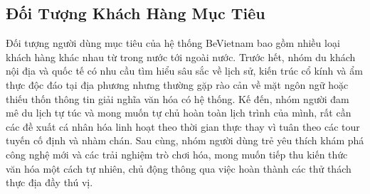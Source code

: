 \subsection{Đối Tượng Khách Hàng Mục Tiêu}
\contrib

Đối tượng người dùng mục tiêu của hệ thống BeVietnam bao gồm nhiều loại khách hàng khác nhau từ trong
nước tới ngoài nước. Trước hết, nhóm du khách nội địa và quốc tế có nhu
cầu tìm hiểu sâu sắc về lịch sử, kiến trúc cổ kính và ẩm thực độc đáo
tại địa phương nhưng thường gặp rào cản về mặt ngôn ngữ hoặc thiếu thốn
thông tin giải nghĩa văn hóa có hệ thống. Kế đến, nhóm người đam mê
du lịch tự túc và mong muốn tự chủ hoàn toàn lịch trình của mình, rất
cần các đề xuất cá nhân hóa linh hoạt theo thời gian thực thay vì tuân
theo các tour tuyến cố định và nhàm chán. Sau cùng, nhóm người dùng trẻ
yêu thích khám phá công nghệ mới và các trải nghiệm trò chơi hóa, mong
muốn tiếp thu kiến thức văn hóa một cách tự nhiên, chủ động thông qua
việc hoàn thành các thử thách thực địa đầy thú vị.
